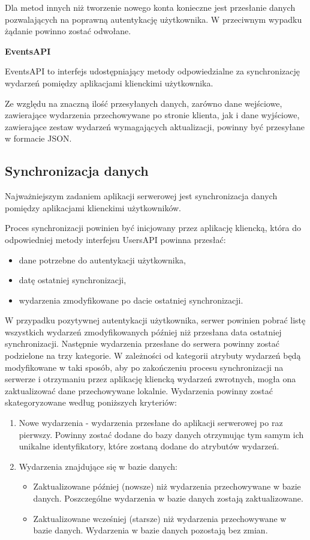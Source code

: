 Dla metod innych niż tworzenie nowego konta konieczne jest przesłanie danych pozwalających na poprawną autentykację użytkownika. W przeciwnym wypadku żądanie powinno zostać odwołane.

\textbf{EventsAPI}

EventsAPI to interfejs udostępniający metody odpowiedzialne za synchronizację wydarzeń pomiędzy aplikacjami klienckimi użytkownika.

Ze względu na znaczną ilość przesyłanych danych, zarówno dane wejściowe, zawierające wydarzenia przechowywane po stronie klienta, jak i dane wyjściowe, zawierające zestaw wydarzeń wymagających aktualizacji, powinny być przesyłane w formacie JSON.

\subsection{Synchronizacja danych}
\label{synDanych}

Najważniejszym zadaniem aplikacji serwerowej jest synchronizacja danych pomiędzy aplikacjami klienckimi użytkowników.

Proces synchronizacji powinien być inicjowany przez aplikację kliencką, która do odpowiedniej metody interfejsu UsersAPI powinna przesłać:

\begin{itemize}
\item dane potrzebne do autentykacji użytkownika,
\item datę ostatniej synchronizacji,
\item wydarzenia zmodyfikowane po dacie ostatniej synchronizacji.
\end{itemize}

W przypadku pozytywnej autentykacji użytkownika, serwer powinien pobrać listę wszystkich wydarzeń zmodyfikowanych później niż przesłana data ostatniej synchronizacji. Następnie wydarzenia przesłane do serwera powinny zostać podzielone na trzy kategorie. W zależności od kategorii atrybuty wydarzeń będą modyfikowane w taki sposób, aby po zakończeniu procesu synchronizacji na serwerze i otrzymaniu przez aplikację kliencką wydarzeń zwrotnych, mogła ona zaktualizować dane przechowywane lokalnie. Wydarzenia powinny zostać skategoryzowane według poniższych kryteriów:

\begin{enumerate}
  \item Nowe wydarzenia - wydarzenia przesłane do aplikacji serwerowej po raz pierwszy. Powinny zostać dodane do bazy danych otrzymując tym samym ich unikalne identyfikatory, które zostaną dodane do atrybutów wydarzeń.
  \item Wydarzenia znajdujące się w bazie danych:
  \begin{itemize}
    \item Zaktualizowane później (nowsze) niż wydarzenia przechowywane w bazie danych. Poszczególne wydarzenia w bazie danych zostają zaktualizowane.
    \item Zaktualizowane wcześniej (starsze) niż wydarzenia przechowywane w bazie danych. Wydarzenia w bazie danych pozostają bez zmian.
  \end{itemize}
\end{enumerate}

